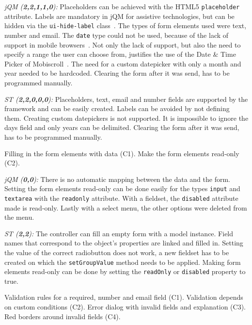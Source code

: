 \documentclass[a4paper]{artikel3}
\newcommand{\code}[1]{\texttt{#1}}
\newcommand{\setspace}[0]{\vspace{2mm}}
\renewcommand{\paragraph}[1]{\setspace \noindent {\bf #1}  }
\newcommand{\framework}[2]{ \emph{#1 (\textbf{#2}): }} %
\newcommand{\challenge}[1]{\paragraph{#1}}
\begin{document}
\framework{jQM}{2,2,1,1,0}
Placeholders can be achieved with the HTML5 \code{placeholder} attribute.
Labels are mandatory in jQM for assistive technologies, but can be hidden via the \code{ui-hide-label} class~\cite{JQuery2013}. 
The types of form elements used were text, number and email.
The \code{date} type could not be used, because of the lack of support in mobile browsers~\cite{Deveria2013b}.
Not only the lack of support, but also the need to specify a range the user can choose from, justifies the use of the Date \& Time Picker of Mobiscroll~\cite{Mobiscroll2013}.
The need for a custom datepicker with only a month and year needed to be hardcoded.
Clearing the form after it was send, has to be programmed manually.

\framework{ST}{2,2,0,0,0}
Placeholders, text, email and number fields are supported by the framework and can be easily created.  
Labels can be avoided by not defining them.  
Creating custom datepickers is not supported.  
It is impossible to ignore the days field and only years can be delimited.  
Clearing the form after it was send, has to be programmed manually.

\challenge{Form filling (C1,C2)}
Filling in the form elements with data (C1).
Make the form elements read-only (C2).

\framework{jQM}{0,0}
There is no automatic mapping between the data and the form.
Setting the form elements read-only can be done easily for the types \code{input} and \code{textarea} with the \code{readonly} attribute.
With a fieldset, the \code{disabled} attribute made is read-only.
Lastly with a select menu, the other options were deleted from the menu.

\framework{ST}{2,2}
The controller can fill an empty form with a model instance.
Field names that correspond to the object's properties are linked and filled in.
Setting the value of the correct radiobutton does not work,  a new fieldset has to be created on which the \code{setGroupValue} method needs to be applied.  
Making form elements read-only can be done by setting the \code{readOnly} or \code{disabled} property to true.

\challenge{Form validation (C1,C2,C3,C4)}
Validation rules for a required, number and email field (C1).
Validation depends on custom conditions (C2).
Error dialog with invalid fields and explanation (C3).
Red borders around invalid fields (C4).
\end{document}
